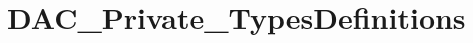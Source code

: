 \hypertarget{group___d_a_c___private___types_definitions}{}\section{D\+A\+C\+\_\+\+Private\+\_\+\+Types\+Definitions}
\label{group___d_a_c___private___types_definitions}

